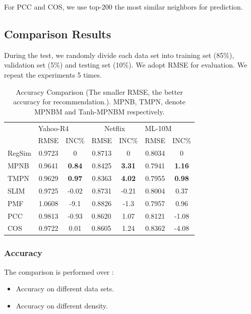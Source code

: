 \documentclass[conference]{IEEEtran}
\begin{document}
For PCC and COS, we use top-200 the most similar neighbors for prediction.

\subsection{Comparison Results}
During the test, we randomly divide each data set into training set (85\%), validation set (5\%) and testing set (10\%). We adopt RMSE for evaluation.
We repeat the experiments 5 times.
\begin{table}[!ht]
\small
\centering
\caption{Accuracy Comparison (The smaller RMSE, the better accuracy for recommendation.). MPNB,  TMPN, denote MPNBM and Tanh-MPNBM respectively. }
\begin{tabular}{|l|c|c|c|c|c|c|}
\hline
\multirow{2}{*}{} & \multicolumn{2}{l|}{Yahoo-R4} & \multicolumn{2}{c|}{Netflix}                & \multicolumn{2}{l|}{ML-10M} \\ \cline{2-7}
                  & RMSE       & INC\%            & RMSE                        & INC\%         & RMSE      & INC\%           \\ \hline
RegSim              & 0.9723     & 0             & 0.8713                      & 0        & 0.8034    & 0           \\ \hline
MPNB             & 0.9641     & \textbf{0.84}    & 0.8425                      & \textbf{3.31} & 0.7941    & \textbf{1.16}   \\ \hline
TMPN      & 0.9629     & \textbf{0.97}    & 0.8363                      & \textbf{4.02} & 0.7955    & \textbf{0.98}   \\ \hline
SLIM           & 0.9725     & -0.02             & 0.8731                      & -0.21         & 0.8004    & 0.37            \\ \hline
PMF               & 1.0608     & -9.1            & 0.8826                      & -1.3         & 0.7957    & 0.96             \\ \hline
PCC               & 0.9813     & -0.93                & \multicolumn{1}{l|}{0.8620} & 1.07             & 0.8121    & -1.08               \\ \hline
COS               & 0.9722     & 0.01             & \multicolumn{1}{l|}{0.8605} &1.24          & 0.8362    & -4.08           \\ \hline
\end{tabular}
\label{accuracy-table-rmse}
\end{table}

\subsubsection{Accuracy}
\label{cpt}
The comparison is performed over :
\begin{itemize}
\item Accuracy on different data sets.
\item Accuracy on different density.
\end{itemize}
\end{document}
